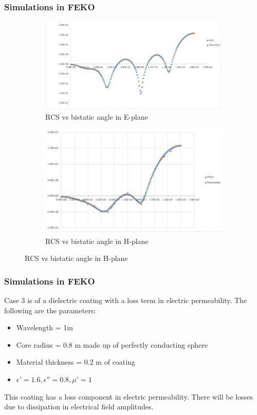 \documentclass{beamer}
\begin{document}
\begin{frame}
\frametitle{Simulations in FEKO}
\begin{figure}[H]
\centering
\begin{subfigure}{0.48\textwidth}
\centering
\includegraphics[width = \linewidth]{case2.PNG}
\caption{RCS vs bistatic angle in E-plane}
\end{subfigure}
\begin{subfigure}{0.48\textwidth}
\centering
\includegraphics[width = \linewidth]{case2hplane.PNG}
\caption{RCS vs bistatic angle in H-plane}
\end{subfigure}
\end{figure}
\end{frame}
\begin{frame}
\frametitle{Simulations in FEKO}
Case 3 is of a dielectric coating with a loss term in electric permeability. The following are the parameters:
\begin{itemize}
\item Wavelength = 1m
\item Core radius = 0.8 m made up of perfectly conducting sphere
\item Material thickness = 0.2 m of coating
\item $\epsilon' = 1.6, \epsilon'' = 0.8, \mu' = 1$
\end{itemize}
This coating has a loss component in electric permeability. There will be losses due to dissipation in electrical field amplitudes. 
\end{frame}
\end{document}
